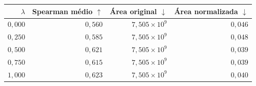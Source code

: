 \begin{tabular}{rrrr}
\toprule
$\lambda$ & Spearman médio $\uparrow$ & Área original $\downarrow$ & Área normalizada $\downarrow$ \\
\midrule
$0{,}000$ & $0{,}560$ & $7{,}505\times 10^{9}$ & $0{,}046$ \\
$0{,}250$ & $0{,}585$ & $7{,}505\times 10^{9}$ & $0{,}048$ \\
$0{,}500$ & $0{,}621$ & $7{,}505\times 10^{9}$ & $0{,}039$ \\
$0{,}750$ & $0{,}615$ & $7{,}505\times 10^{9}$ & $0{,}039$ \\
$1{,}000$ & $0{,}623$ & $7{,}505\times 10^{9}$ & $0{,}040$ \\
\bottomrule
\end{tabular}
